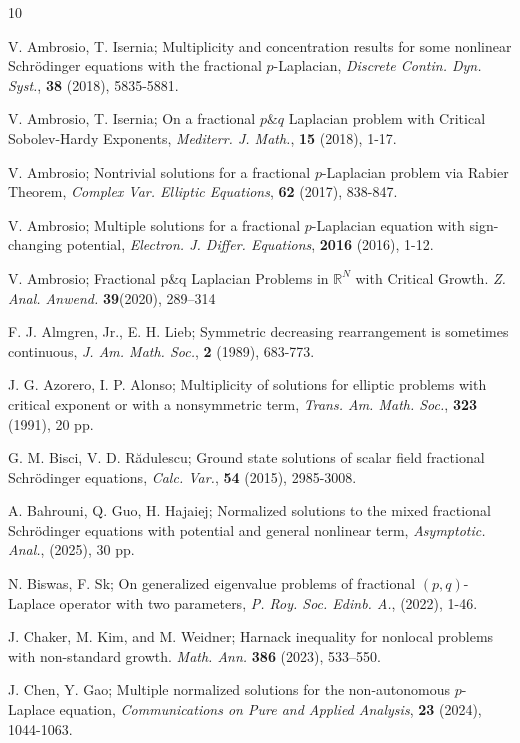 \documentclass[reqno]{amsart}
\begin{document}
\begin{thebibliography}{10}

V. Ambrosio, T. Isernia;
Multiplicity and concentration results for some nonlinear Schr\"{o}dinger equations 
with the fractional $p$-Laplacian,
\emph{Discrete Contin. Dyn. Syst.}, \textbf{38} (2018), 5835-5881.

V. Ambrosio, T. Isernia;
On a fractional $p\&q$ Laplacian problem
with Critical Sobolev-Hardy Exponents,
\emph{Mediterr. J. Math.},
\textbf{15} (2018), 1-17.

V. Ambrosio;
Nontrivial solutions for a fractional $p$-Laplacian problem via Rabier Theorem,
\emph{Complex Var. Elliptic Equations},
\textbf{62} (2017), 838-847.

V. Ambrosio;
Multiple solutions for a fractional $p$-Laplacian equation with sign-changing potential,
\emph{Electron. J. Differ. Equations},
\textbf{2016} (2016), 1-12.

V. Ambrosio; 
Fractional p\&q Laplacian Problems in $\mathbb{R}^N$  with Critical Growth. 
\emph{Z. Anal. Anwend.} \textbf{39}(2020), 289–314

F. J. Almgren, Jr.,  E. H. Lieb;
Symmetric decreasing rearrangement is sometimes continuous,
\emph{J. Am. Math. Soc.},
\textbf{2} (1989), 683-773.

J. G. Azorero, I. P. Alonso;
Multiplicity of solutions
for elliptic problems with critical exponent
or with a nonsymmetric term,
\emph{Trans. Am. Math. Soc.},
\textbf{323} (1991), 20 pp.


G. M. Bisci, V. D. R\u{a}dulescu;
Ground state solutions of scalar field fractional
Schr\"{o}dinger equations,
\emph{Calc. Var.},
\textbf{54} (2015), 2985-3008.

A. Bahrouni, Q. Guo, H. Hajaiej;
Normalized solutions to the mixed fractional Schr\"{o}dinger equations with potential and general nonlinear term,
\emph{Asymptotic. Anal.},
\textbf{} (2025), 30 pp.

N. Biswas, F. Sk;
On generalized eigenvalue problems of fractional $(p, q)$-Laplace operator with two parameters,
\emph{P. Roy. Soc. Edinb. A.},
\textbf{} (2022), 1-46.

 J. Chaker, M. Kim, and M. Weidner; Harnack inequality for nonlocal problems with
non-standard growth. \emph{Math. Ann.} \textbf{386} (2023), 533–550.

 J. Chen,  Y. Gao;
Multiple normalized solutions for the non-autonomous $p$-Laplace equation, \emph{Communications on Pure and Applied Analysis}, \textbf{23} (2024), 1044-1063.


\end{thebibliography}
\end{document}
